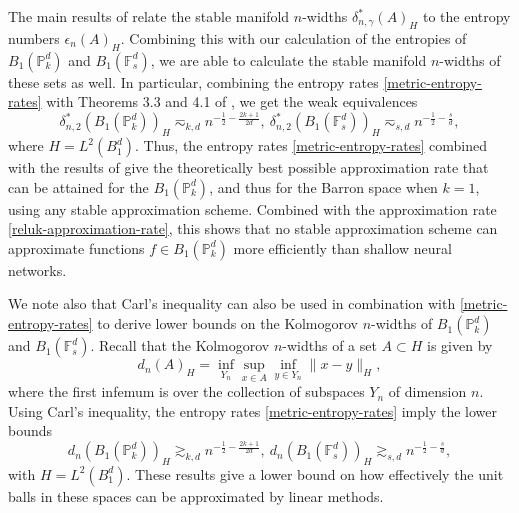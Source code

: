 The main results of \cite{cohen2020optimal} relate the stable manifold $n$-widths $\delta^*_{n,\gamma}(A)_H$ to the entropy numbers $\epsilon_n(A)_H$. Combining this with our calculation of the entropies of $B_1(\mathbb{P}_k^d)$ and $B_1(\mathbb{F}_s^d)$, we are able to calculate the stable manifold $n$-widths of these sets as well. In particular, combining the entropy rates \eqref{metric-entropy-rates} with Theorems 3.3 and 4.1 of \cite{cohen2020optimal}, we get the weak equivalences
\begin{equation}
 \delta^*_{n,2}(B_1(\mathbb{P}_k^d))_{H}  \eqsim_{k,d} n^{-\frac{1}{2} - \frac{2k+1}{2d}},~ \delta^*_{n,2}(B_1(\mathbb{F}_s^d))_{H} \eqsim_{s,d} n^{-\frac{1}{2} - \frac{s}{d}},
\end{equation}
where $H = L^2(B_1^d)$.
Thus, the entropy rates \eqref{metric-entropy-rates} combined with the results of \cite{cohen2020optimal} give the theoretically best possible approximation rate that can be attained for the $B_1(\mathbb{P}_k^d)$, and thus for the Barron space when $k=1$, using any stable approximation scheme. Combined with the approximation rate \eqref{reluk-approximation-rate}, this shows that no stable approximation scheme can approximate functions $f\in B_1(\mathbb{P}_k^d)$ more efficiently than shallow neural networks.

We note also that Carl's inequality \cite{carl1981entropy} can also be used in combination with \eqref{metric-entropy-rates} to derive lower bounds on the Kolmogorov $n$-widths of $B_1(\mathbb{P}_k^d)$ and $B_1(\mathbb{F}_s^d)$. Recall that the Kolmogorov $n$-widths of a set $A\subset H$ is given by
\begin{equation}
 d_n(A)_H = \inf_{Y_n}\sup_{x\in A}\inf_{y\in Y_n}\|x - y\|_H,
\end{equation}
where the first infemum is over the collection of subspaces $Y_n$ of dimension $n$. Using Carl's inequality, the entropy rates \eqref{metric-entropy-rates} imply the lower bounds
\begin{equation}
 d_n(B_1(\mathbb{P}_k^d))_{H}  \gtrsim_{k,d} n^{-\frac{1}{2} - \frac{2k+1}{2d}},~ d_n(B_1(\mathbb{F}_s^d))_{H} \gtrsim_{s,d} n^{-\frac{1}{2} - \frac{s}{d}},
\end{equation}
with $H = L^2(B_1^d)$. These results give a lower bound on how effectively the unit balls in these spaces can be approximated by linear methods.

